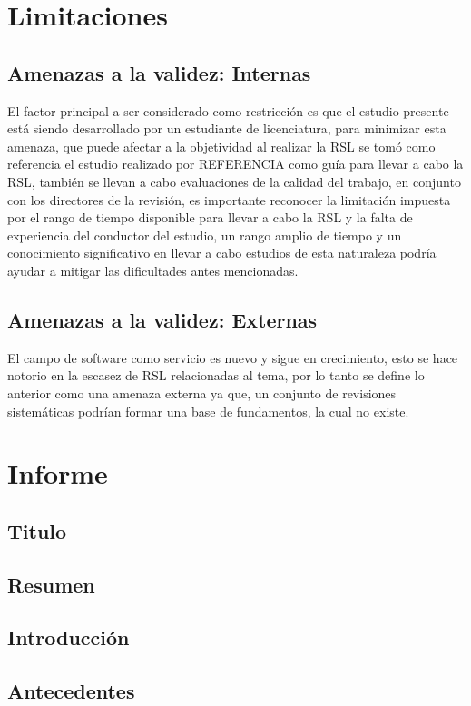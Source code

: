 \documentclass{article}
\begin{document}
\section{Limitaciones}
\subsection{Amenazas a la validez: Internas}
El factor principal a ser considerado como restricción es que el estudio presente está siendo 
desarrollado por un estudiante de licenciatura, para minimizar esta amenaza, que puede afectar a la objetividad 
al realizar la RSL se tomó como referencia el estudio realizado por REFERENCIA 
como guía para llevar a cabo la RSL, también se llevan a cabo evaluaciones de la calidad del trabajo, en conjunto 
con los directores de la revisión, es importante reconocer la limitación impuesta por el rango de tiempo disponible para 
llevar a cabo la RSL y la falta de experiencia del conductor del estudio, un rango amplio de tiempo y un conocimiento significativo 
en llevar a cabo estudios de esta naturaleza podría ayudar a mitigar las dificultades antes mencionadas.

\subsection{Amenazas a la validez: Externas}
El campo de software como servicio es nuevo y sigue en crecimiento, esto se hace notorio en la escasez de 
RSL relacionadas al tema, por lo tanto se define lo anterior como  una amenaza externa ya que, un conjunto 
de revisiones sistemáticas podrían formar una base de fundamentos, la cual no existe.
\newpage


\section{Informe}
\subsection{Titulo}
\subsection{Resumen}
\subsection{Introducción}
\subsection{Antecedentes}
\end{document}
